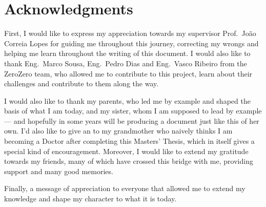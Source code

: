\chapter*{Acknowledgments}

First, I would like to express my appreciation towards my supervisor Prof.\ João Correia Lopes for guiding me throughout this journey, correcting my wrongs and helping me learn throughout the writing of this document. I would also like to thank Eng.\ Marco Sousa, Eng.\ Pedro Dias and Eng.\ Vasco Ribeiro from the ZeroZero team, who allowed me to contribute to this project, learn about their challenges and contribute to them along the way. 

I would also like to thank my parents, who led me by example and shaped the basis of what I am today, and my sister, whom I am supposed to lead by example --- and hopefully in some years will be producing a document just like this of her own. I'd also like to give an  to my grandmother who naively thinks I am becoming a Doctor after completing this Masters' Thesis, which in itself gives a special kind of encouragement. Moreover, I would like to extend my gratitude towards my friends, many of which have crossed this bridge with me, providing support and many good memories. 

Finally, a message of appreciation to everyone that allowed me to extend my knowledge and shape my character to what it is today.

\vspace{10mm}
